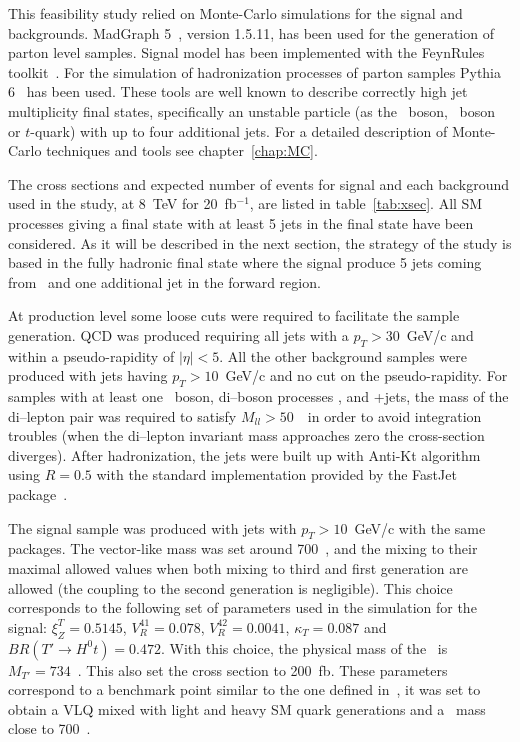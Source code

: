 This feasibility study relied on Monte-Carlo simulations for the signal and backgrounds. MadGraph 5~\cite{Alwall:2014hca, Alwall:2011uj}, version 1.5.11, has been used for the generation of parton level samples. Signal model has been implemented with the FeynRules toolkit~\cite{Alloul:2013bka}. For the simulation of hadronization processes of parton samples Pythia 6~\cite{Sjostrand:2006za} has been used. These tools are well known to describe correctly high jet multiplicity final states, specifically an unstable particle (as the \W~boson, \Z~boson or $t$-quark) with up to four additional jets. For a detailed description of Monte-Carlo techniques and tools see chapter~\ref{chap:MC}. 

The cross sections and expected number of events for signal and each background used in the study, at 8~TeV for 20~fb$^{-1}$, are listed in table~\ref{tab:xsec}. All SM processes giving a final state with at least 5 jets in the final state have been considered. As it will be described in the next section, the strategy of the study is based in the fully hadronic final state where the signal produce 5 jets coming from \Tp~and one additional jet in the forward region.

At production level some loose cuts were required to facilitate the sample generation. QCD was produced requiring all jets with a $p_{T}>30$~GeV/c and within a pseudo-rapidity of $|\eta|<5$. All the other background samples were produced with jets having $p_{T}>10$~GeV/c and no cut on the pseudo-rapidity. For samples with at least one \Z~boson, di--boson processes \Z\Z, \W\Z and \Z+jets, the mass of the di--lepton pair was required to satisfy $M_{ll}>50$~\GeVcc~in order to avoid integration troubles (when the di--lepton invariant mass approaches zero the cross-section diverges). After hadronization, the jets were built up with Anti-Kt algorithm using $R=0.5$ with the standard implementation provided by the FastJet package~\cite{Cacciari:2011ma}.

The signal sample was produced with jets with $p_{T}>10$~GeV/c with the same packages. The vector-like mass was set around 700~\GeVcc, and the mixing to their maximal allowed values when both mixing to third and first generation are allowed (the coupling to the second generation is negligible). This choice corresponds to the following set of parameters used in the simulation for the signal: $\xi_Z^{T}=0.5145$, $V_{R}^{41}=0.078$, $V_{R}^{42}=0.0041$, $\kappa_{T}=0.087$ and $BR(T' \to H^{0} t)=0.472$. With this choice, the physical mass of the \Tp~is $M_{T'}=734$~\GeVcc. This also set the cross section to 200~fb. These parameters correspond to a benchmark point similar to the one defined in~\cite{Cacciapaglia:2011fx}, it was set to obtain a VLQ mixed with light and heavy SM quark generations and a \Tp~mass close to 700~\GeVcc.

